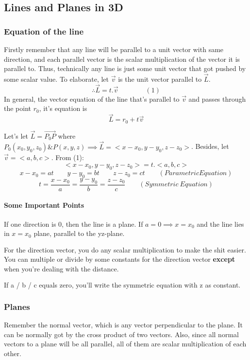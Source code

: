 \documentclass{article}
\begin{document}
\subsection{Lines and Planes in 3D}

\subsubsection{Equation of the line}

Firstly remember that any line will be parallel to a unit vector with same direction, and each parallel vector is the scalar multiplication of the vector it is parallel to. Thus, technically any line is just some unit vector that got pushed by some scalar value. To elaborate, let $ \vec{ v } $ is the unit vector parallel to $ \vec{ L } $.
\[
	\therefore \vec{ L } = t . \vec{ v }	\qquad \qquad (1)
\]
In general, the vector equation of the line that's parallel to $ \vec{ v } $ and passes through the point $r_0$, it's equation is
\[
	\vec{ L } = r_0 + t \vec{ v }
\]

Let's let $\vec{ L } = \vec{ P_0P}$ where $ P_0(x_0,y_0,z_0) \& P(x,y,z) \implies \vec{L} = <x-x_0,y-y_0,z-z_0>$. Besides, let $ \vec{ v } = <a,b,c>$. From (1):
\begin{equation*}
	<x-x_0,y-y_0,z-z_0> = t. <a,b,c>  
\end{equation*}
\begin{equation*}
	x-x_0=at \qquad y-y_0=bt \qquad z-z_0=ct \qquad (Parametric Equation)
\end{equation*}
\[
	t= \frac{ x-x_0 }{a} = \frac{ y-y_0 }{b} = \frac{ z-z_0 }{c }   \qquad (Symmetric\ Equation)
\]

\paragraph{Some Important Points}
If one direction is 0, then the line is a plane. If $a=0 \implies x=x_0 $ and the line lies in $x=x_0$ plane, parallel to the yz-plane. 

For the direction vector, you do any scalar multiplication to make the shit easier. You can multiple or divide by some constants for the direction vector \textbf{except} when you're dealing with the distance.

If a / b / c equals zero, you'll write the symmetric equation with z as constant.

\newpage
\subsubsection{Planes}
Remember the normal vector, which is any vector perpendicular to the plane. 
It can be normally got by the cross product of two vectors.
Also, since all normal vectors to a plane will be all parallel, all of them are scalar multiplication of each other. 
\end{document}
